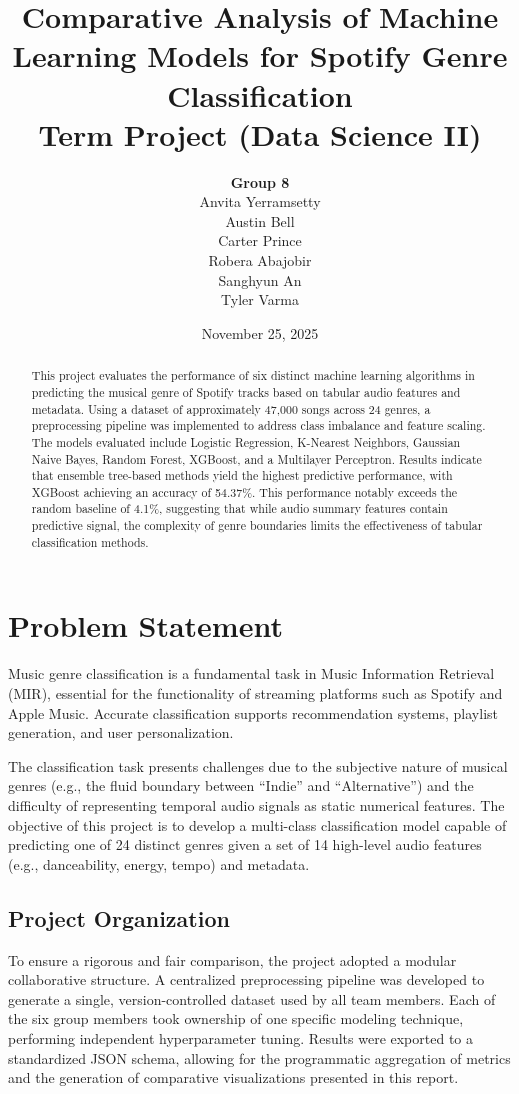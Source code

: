 \documentclass[12pt, a4paper]{article}
\title{\textbf{Comparative Analysis of Machine Learning Models for Spotify Genre Classification}\\
\large Term Project (Data Science II)}
\author{
\textbf{Group 8} \\
Anvita Yerramsetty \\
Austin Bell \\
Carter Prince \\
Robera Abajobir \\
Sanghyun An \\
Tyler Varma
}
\date{November 25, 2025}
\begin{document}
\maketitle

\begin{abstract}
This project evaluates the performance of six distinct machine learning algorithms in predicting the musical genre of Spotify tracks based on tabular audio features and metadata. Using a dataset of approximately 47,000 songs across 24 genres, a preprocessing pipeline was implemented to address class imbalance and feature scaling. The models evaluated include Logistic Regression, K-Nearest Neighbors, Gaussian Naive Bayes, Random Forest, XGBoost, and a Multilayer Perceptron. Results indicate that ensemble tree-based methods yield the highest predictive performance, with XGBoost achieving an accuracy of 54.37\%. This performance notably exceeds the random baseline of 4.1\%, suggesting that while audio summary features contain predictive signal, the complexity of genre boundaries limits the effectiveness of tabular classification methods.
\end{abstract}

\tableofcontents
\newpage

\section{Problem Statement}
Music genre classification is a fundamental task in Music Information Retrieval (MIR), essential for the functionality of streaming platforms such as Spotify and Apple Music. Accurate classification supports recommendation systems, playlist generation, and user personalization.

The classification task presents challenges due to the subjective nature of musical genres (e.g., the fluid boundary between ``Indie'' and ``Alternative'') and the difficulty of representing temporal audio signals as static numerical features. The objective of this project is to develop a multi-class classification model capable of predicting one of 24 distinct genres given a set of 14 high-level audio features (e.g., danceability, energy, tempo) and metadata.

\subsection{Project Organization}
To ensure a rigorous and fair comparison, the project adopted a modular collaborative structure. A centralized preprocessing pipeline was developed to generate a single, version-controlled dataset used by all team members. Each of the six group members took ownership of one specific modeling technique, performing independent hyperparameter tuning. Results were exported to a standardized JSON schema, allowing for the programmatic aggregation of metrics and the generation of comparative visualizations presented in this report.
\end{document}
